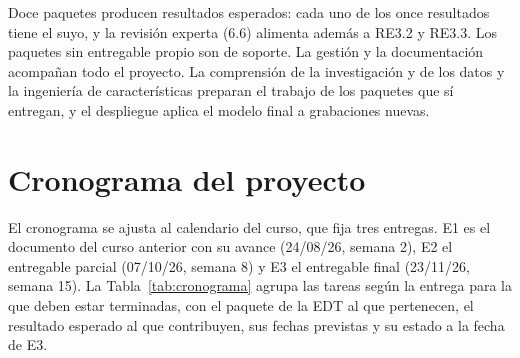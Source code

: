 Doce paquetes producen resultados esperados: cada uno de los once resultados
tiene el suyo, y la revisión experta (6.6) alimenta además a RE3.2 y RE3.3. Los
paquetes sin entregable propio son de soporte. La gestión y la documentación
acompañan todo el proyecto. La comprensión de la investigación y de los datos y la
ingeniería de características preparan el trabajo de los paquetes que sí
entregan, y el despliegue aplica el modelo final a grabaciones nuevas.

\section{Cronograma del proyecto}
\label{sec:cronograma}

El cronograma se ajusta al calendario del curso, que fija tres entregas. E1 es el
documento del curso anterior con su avance (24/08/26, semana 2), E2 el entregable
parcial (07/10/26, semana 8) y E3 el entregable final (23/11/26, semana 15). La
Tabla~\ref{tab:cronograma} agrupa las tareas según la entrega para la que deben
estar terminadas, con el paquete de la EDT al que pertenecen, el resultado
esperado al que contribuyen, sus fechas previstas y su estado a la fecha de E3.

